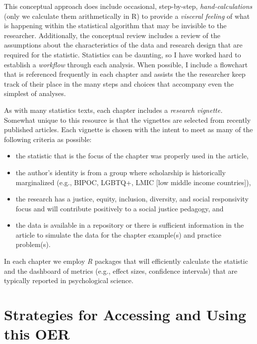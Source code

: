 \documentclass[
  11pt,
]{book}
\providecommand{\tightlist}{%
  \setlength{\itemsep}{0pt}\setlength{\parskip}{0pt}}
\begin{document}
This conceptual approach does include occasional, step-by-step, \emph{hand-calculations} (only we calculate them arithmetically in R) to provide a \emph{visceral feeling} of what is happening within the statistical algorithm that may be invisible to the researcher. Additionally, the conceptual review includes a review of the assumptions about the characteristics of the data and research design that are required for the statistic. Statistics can be daunting, so I have worked hard to establish a \emph{workflow} through each analysis. When possible, I include a flowchart that is referenced frequently in each chapter and assists the the researcher keep track of their place in the many steps and choices that accompany even the simplest of analyses.

As with many statistics texts, each chapter includes a \emph{research vignette.} Somewhat unique to this resource is that the vignettes are selected from recently published articles. Each vignette is chosen with the intent to meet as many of the following criteria as possible:

\begin{itemize}
\tightlist
\item
  the statistic that is the focus of the chapter was properly used in the article,
\item
  the author's identity is from a group where scholarship is historically marginalized (e.g., BIPOC, LGBTQ+, LMIC {[}low middle income countries{]}),
\item
  the research has a justice, equity, inclusion, diversity, and social responsivity focus and will contribute positively to a social justice pedagogy, and
\item
  the data is available in a repository or there is sufficient information in the article to simulate the data for the chapter example(s) and practice problem(s).
\end{itemize}

In each chapter we employ \emph{R} packages that will efficiently calculate the statistic and the dashboard of metrics (e.g., effect sizes, confidence intervals) that are typically reported in psychological science.

\hypertarget{strategies-for-accessing-and-using-this-oer}{%
\section{Strategies for Accessing and Using this OER}\label{strategies-for-accessing-and-using-this-oer}}
\end{document}
